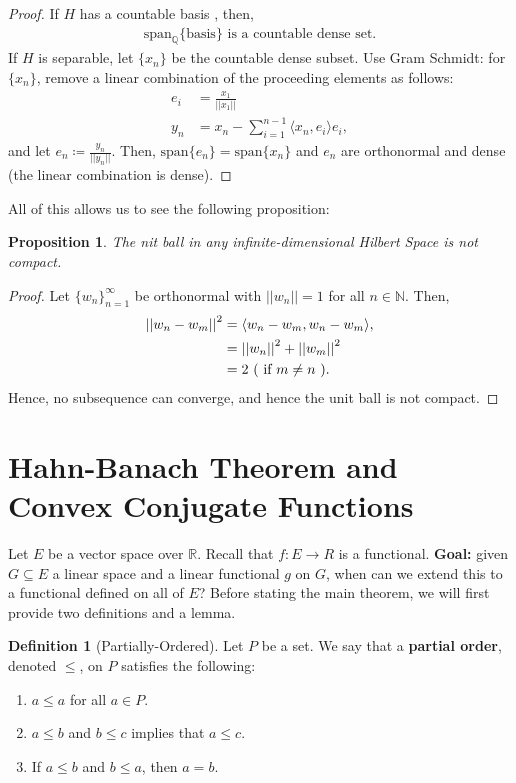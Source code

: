 \documentclass[psamsfonts]{amsart}
\newtheorem{prop}[thm]{Proposition}
\theoremstyle{definition}
\newtheorem{defn}[thm]{Definition}
\theoremstyle{remark}
\newcommand{\R}[0]{\mathbb{R}}
\newcommand{\norm}[1]{	\left| \left| #1 \right| \right| }
\numberwithin{equation}{section}
\begin{document}
\begin{proof}
	If \( H \) has a countable basis , then, 
	\begin{align*}
		\mathrm{span}_{\mathbb{Q}} \{ \text{basis} \} \text{ is a countable dense set.}
	\end{align*}
	If \( H \) is separable, let \( \{ x_n \} \) be the countable dense subset. Use Gram Schmidt: for \( \{ x_n \} \), remove a linear combination of the proceeding elements as follows:
	\begin{align*}
		e_i & = \frac{x_1}{\norm{x_1}} \\
		y_n & = x_n - \sum_{i=1}^{n-1} \langle x_n, e_i \rangle e_i,
	\end{align*}
	and let \( e_n \coloneqq \frac{y_n}{||y_n||} \). Then, \( \text{span}\{e_n\} = \text{span}\{x_n \} \) and \( e_n \) are orthonormal and dense (the linear combination is dense).
\end{proof}
All of this allows us to see the following proposition:
\begin{prop}
	The nit ball in any infinite-dimensional Hilbert Space is not compact. 
\end{prop}

\begin{proof}
	Let \( \{ w_n \}_{n=1}^\infty\) be orthonormal with \( \norm{w_n} = 1 \) for all \( n \in \mathbb{N} \). Then, 
	\begin{align*}
		\norm{w_n - w_m}^2 & = \langle w_n - w_m, w_n - w_m \rangle, \\
		& = \norm{w_n}^2 + \norm{w_m}^2 \\
		& = 2 \text{ ( if \( m \neq n \) )}.
	\end{align*}
	Hence, no subsequence can converge, and hence the unit ball is not compact.
\end{proof}

\section{Hahn-Banach Theorem and Convex Conjugate Functions}
Let \( E \) be a vector space over \( \R \). Recall that \( f: E \rightarrow R \) is a functional. \textbf{Goal:} given \( G \subseteq E \) a linear space and a linear functional \( g \) on \( G \), when can we extend this to a functional defined on all of \( E \)? Before stating the main theorem, we will first provide two definitions and a lemma. 

\begin{defn}[Partially-Ordered]
	Let \( P \) be a set. We say that a \textbf{partial order}, denoted \( \leq \), on \( P \) satisfies the following: 
	\begin{enumerate}
		\item \( a \leq a \) for all \( a \in P \). 
		\item \( a \leq b \) and \( b \leq c \) implies that \( a \leq c \). 
		\item If \( a \leq b \) and \( b \leq a \), then \( a =b \).
	\end{enumerate}
\end{defn}
\end{document}
